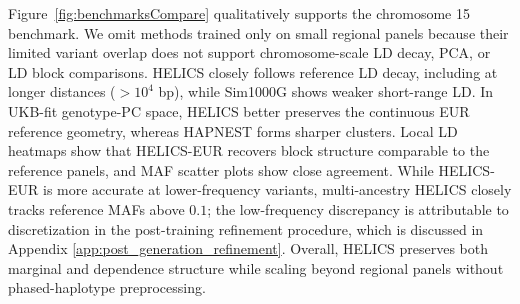 \documentclass{article}
\begin{document}
Figure~\ref{fig:benchmarksCompare} qualitatively supports the chromosome 15 benchmark. We omit methods trained only on small regional panels because their limited variant overlap does not support chromosome-scale LD decay, PCA, or LD block comparisons. HELICS closely follows reference LD decay, including at longer distances (\(>10^4\) bp), while Sim1000G shows weaker short-range LD. In UKB-fit genotype-PC space, HELICS better preserves the continuous EUR reference geometry, whereas HAPNEST forms sharper clusters. Local LD heatmaps show that HELICS-EUR recovers block structure comparable to the reference panels, and MAF scatter plots show close agreement. While HELICS-EUR is more accurate at lower-frequency variants, multi-ancestry HELICS closely tracks reference MAFs above \(0.1\); the low-frequency discrepancy is attributable to discretization in the post-training refinement procedure, which is discussed in Appendix \ref{app:post_generation_refinement}. Overall, HELICS preserves both marginal and dependence structure while scaling beyond regional panels without phased-haplotype preprocessing.


\begin{table}[h]
\centering
\caption{Metrics and abbreviations follow Table~\ref{tab:main_benchmark}. Values are means \(\pm\) SD across 22 chromosomes or, for Sim1000G, independently simulated regions for each autosome.}
\label{tab:autosome_benchmark}
\scriptsize
{}
\end{table}
\end{document}
